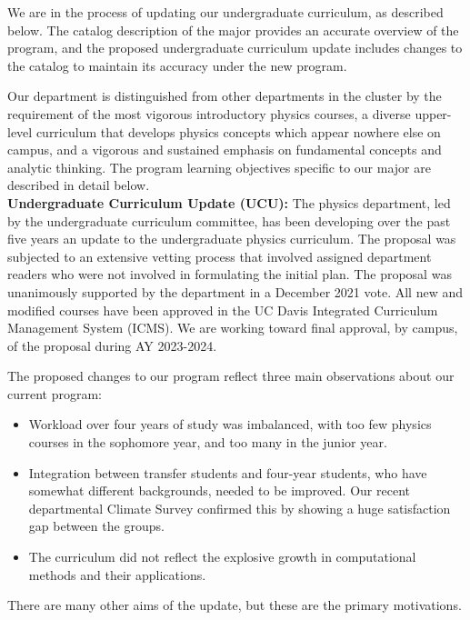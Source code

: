 \documentclass[12pt]{article}
\begin{document}
We are in the process of updating our undergraduate curriculum, as
described below.  The catalog description of the major provides an
accurate overview of the program, and the proposed undergraduate
curriculum update includes changes to the catalog to maintain its
accuracy under the new program.

Our department is distinguished from other departments in the cluster
by the requirement of the most vigorous introductory physics courses,
a diverse upper-level curriculum that develops physics concepts which
appear nowhere else on campus, and a vigorous and sustained emphasis
on fundamental concepts and analytic thinking.  The program learning
objectives specific to our major are described in detail below.\\[3pt]

\noindent
{\bf Undergraduate Curriculum Update (UCU):}
The physics department, led by the undergraduate curriculum committee,
has been developing over the past five years an update to the
undergraduate physics curriculum.  The proposal was subjected to an
extensive vetting process that involved assigned department readers
who were not involved in formulating the initial plan.  The proposal
was unanimously supported by the department in a December 2021 vote.
All new and modified courses have been approved in the UC Davis
Integrated Curriculum Management System (ICMS).  We are working toward
final approval, by campus, of the proposal during AY 2023-2024.

The proposed changes to our program reflect three main observations
about our current program:
\begin{itemize}
 \item Workload over four years of study was imbalanced, with too few
   physics courses in the sophomore year, and too many in the junior
   year.
 \item Integration between transfer students and four-year students,
   who have somewhat different backgrounds, needed to be improved. Our
   recent departmental Climate Survey confirmed this by showing a huge
   satisfaction gap between the groups.
 \item The curriculum did not reflect the explosive growth in
   computational methods and their applications.
\end{itemize}

There are many other aims of the update, but these are the primary
motivations.
\end{document}
